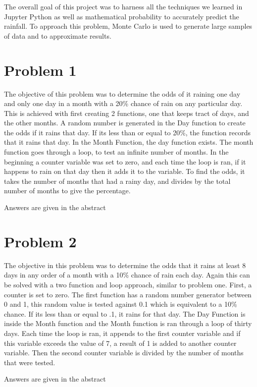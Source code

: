 \documentclass[twocolumn]{revtex4}
\begin{document}
The overall goal of this project was to harness all the techniques we learned in Jupyter Python as well as mathematical probability to accurately predict the rainfall. To approach this problem, Monte Carlo is used to generate large samples of data and to approximate results.  


\section{Problem 1}

The objective of this problem was to determine the odds of it raining one day and only one day in a month with a 20\% chance of rain on any particular day. This is achieved with first creating 2 functions, one that keeps tract of days, and the other months. A random number is generated in the Day function to create the odds if it rains that day. If its less than or equal to 20\%, the function records that it rains that day. In the Month Function, the day function exists. The month function goes through a loop, to test an infinite number of months. In the beginning a counter variable was set to zero, and each time the loop is ran, if it happens to rain on that day then it adds it to the variable. To find the odds, it takes the number of months that had a rainy day, and divides by the total number of months to give the percentage.\begin{it} Answers are given in the abstract \end{it}
\section{Problem 2}

The objective in this problem was to determine the odds that it rains at least 8 days in any order of a month with a 10\% chance of rain each day. Again this can be solved with a two function and loop approach, similar to problem one. First, a counter is set to zero. The first function has a random number generator between 0 and 1, this random value is tested against 0.1 which is equivalent to a 10\% chance. If its less than or equal to .1, it rains for that day. The Day Function is inside the Month function and the Month function is ran through a loop of thirty days. Each time the loop is ran, it appends to the first counter variable and if this variable exceeds the value of 7, a result of 1 is added to another counter variable. Then the second counter variable is divided by the number of months that were tested.\begin{it} Answers are given in the abstract \end{it}
\end{document}
